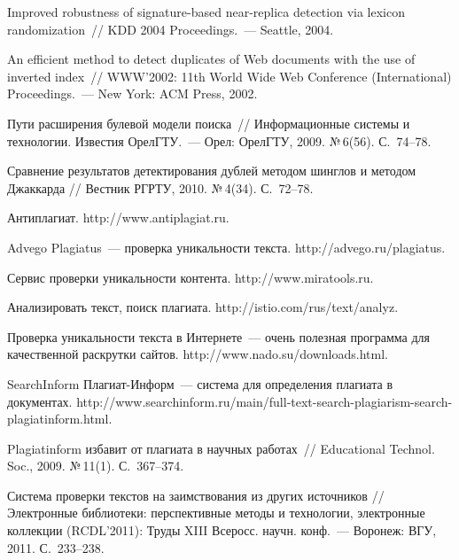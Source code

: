 \begin{multicols}{2}
{{\begin{thebibliography}{99}
   Improved robustness of signature-based 
  near-replica detection via lexicon randomization~//  KDD 2004 Proceedings.~--- Seattle, 2004.
  
  An efficient method to detect duplicates of Web documents with the use of inverted index~// 
WWW'2002: 11th World Wide Web Conference (International) Proceedings.~---  New York: ACM 
Press, 2002. 
  
  Пути расширения булевой модели поиска~// Информационные сис\-те\-мы и технологии. 
Известия ОрелГТУ.~--- Орел: ОрелГТУ, 2009. №\,6(56). С.~74--78.
  
  Сравнение результатов детектирования дублей методом шинглов и методом Джаккарда // 
Вестник РГРТУ, 2010. №\,4(34). С.~72--78.
  
  Антиплагиат. {\sf http://www.antiplagiat.ru}.
  
  Advego Plagiatus~--- проверка уникальности текста. {\sf http://advego.ru/plagiatus}.
  
  Сервис проверки уникальности контента. {\sf http://\linebreak www.miratools.ru}.
  
  Анализировать текст, поиск плагиата. {\sf 
http://\linebreak istio.com/rus/text/analyz}.
  
  Проверка уникальности текста в Интернете~--- очень полезная программа для качественной 
раскрутки сайтов. {\sf http://www.nado.su/downloads.html}.
  
  SearchInform Плагиат-Информ~--- сис\-те\-ма для определения плагиата в документах. {\sf 
http://www.\linebreak searchinform.ru/main/full-text-search-plagiarism-search-plagiatinform.html}.
  
  Plagiatinform избавит от плагиата в научных работах~// Educational Technol. Soc., 
2009. №\,11(1). С.~367--374.

\label{end\stat}
  
  Система проверки текстов на заимствования из других источников // Электронные 
библиотеки: перспективные методы и технологии, электронные коллекции (RCDL'2011):\linebreak 
Труды XIII Всеросс. научн. конф.~--- Воронеж: ВГУ, 2011. 
С.~233--238.

 \end{thebibliography}
}
}


\end{multicols}